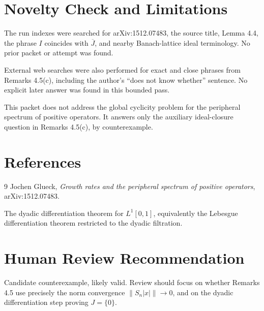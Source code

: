 \documentclass[11pt]{amsart}
\begin{document}
\section*{Novelty Check and Limitations}

The run indexes were searched for arXiv:1512.07483, the source title, Lemma
4.4, the phrase \(I\) coincides with \(\overline J\), and nearby
Banach-lattice ideal terminology. No prior packet or attempt was found.

External web searches were also performed for exact and close phrases from
Remarks 4.5(c), including the author's ``does not know whether'' sentence. No
explicit later answer was found in this bounded pass.

This packet does not address the global cyclicity problem for the peripheral
spectrum of positive operators. It answers only the auxiliary ideal-closure
question in Remarks 4.5(c), by counterexample.

\section*{References}

\begin{thebibliography}{9}
Jochen Glueck,
\emph{Growth rates and the peripheral spectrum of positive operators},
arXiv:1512.07483.

The dyadic differentiation theorem for \(L^1[0,1]\), equivalently the
Lebesgue differentiation theorem restricted to the dyadic filtration.
\end{thebibliography}

\section*{Human Review Recommendation}

Candidate counterexample, likely valid. Review should focus on whether
Remarks 4.5 use precisely the norm convergence \(\|S_n|x|\|\to0\), and on the
dyadic differentiation step proving \(J=\{0\}\).
\end{document}
